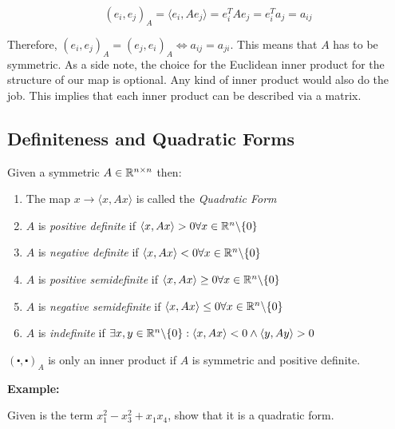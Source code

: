 \[
    (e_i, e_j)_A = \langle e_i, Ae_j\rangle = e_{i}^{T} A e_j = e_{i}^{T} a_j = a_{ij} 
\]

Therefore, \((e_i, e_j)_A = (e_j, e_i)_A \iff a_{ij} = a_{ji}\). This means that \(A\) has to be symmetric.
As a side note, the choice for the Euclidean inner product for the structure of our map is optional. Any
kind of inner product would also do the job. This implies that each inner product can be described via a 
matrix.

\subsection{Definiteness and Quadratic Forms}

Given a symmetric \(A \in \mathbb{R}^{n \times n}\) then:

\begin{enumerate}
    
    \item The map \(x \to \langle x, Ax\rangle\) is called the \emph{Quadratic Form}
    
    \item \(A\) is \emph{positive definite} if \(\langle x, Ax \rangle > 0 \forall x \in \mathbb{R}^n 
          \backslash \{0\}\)

    \item \(A\) is \emph{negative definite} if \(\langle x, Ax \rangle < 0 \forall x \in \mathbb{R}^n 
          \backslash \{0\}\)
    
    \item \(A\) is \emph{positive semidefinite} if \(\langle x, Ax \rangle \ge 0 \forall x \in \mathbb{R}^n 
          \backslash \{0\}\)

    \item \(A\) is \emph{negative semidefinite} if \(\langle x, Ax \rangle \le 0 \forall x \in \mathbb{R}^n 
          \backslash \{0\}\)

    \item \(A\) is \emph{indefinite} if \(\exists x,y \in \mathbb{R}^n  \backslash \{0\}: \langle x, Ax\rangle 
          < 0 \land \langle y, Ay \rangle > 0 \)
    
\end{enumerate}

\((\centerdot , \centerdot)_A\) is only an inner product if \(A\) is symmetric and positive definite.

\textbf{Example:}

Given is the term \(x_{1}^{2} - x_{3}^{2} + x_1 x_4\), show that it is a quadratic form.

